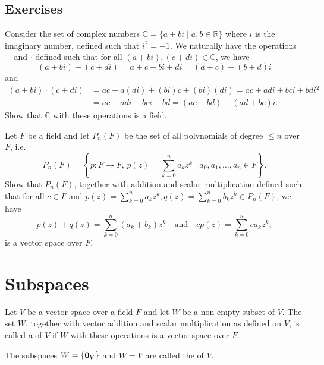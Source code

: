 \subsection*{Exercises}

\begin{exer}\label{exer:cfield}
Consider the set of complex numbers $ \mathbb{C}=\{a+bi\mid a,b\in\mathbb{R}\} $ where $ i $ is the imaginary number, defined such that $ i^2=-1 $. We naturally have the operations $ + $ and $ \cdot $ defined such that for all $ (a+bi),(c+di)\in\mathbb{C} $, we have
\begin{equation*}
    (a+bi)+(c+di)=a+c+bi+di=(a+c)+(b+d)i
\end{equation*}
and
\begin{align*}
    (a+bi)\cdot(c+di) &= ac+a(di)+(bi)c+(bi)(di)=ac+adi+bci+bdi^2 \\
    &= ac+adi+bci-bd=(ac-bd)+(ad+bc)i.
\end{align*}
Show that $ \mathbb{C} $ with these operations is a field.
\end{exer}

\begin{exer}\label{exer:pnvs}
Let $ F $ be a field and let $ P_n(F) $ be the set of all polynomials of degree $ \leq n $ over $ F $, i.e.
\begin{equation*}
    P_n(F)=\left\{p:F\to F,\,p(z)=\sum_{k=0}^n a_k z^k\mid a_0,a_1,\ldots,a_n\in F\right\}.
\end{equation*}
Show that $ P_n(F) $, together with addition and scalar multiplication defined such that for all $ c\in F $ and $ p(z)=\sum_{k=0}^n a_k z^k,q(z)=\sum_{k=0}^n b_k z^k\in P_n(F) $, we have
\begin{equation*}
    p(z)+q(z)=\sum_{k=0}^n (a_k+b_k)z^k \quad\text{and}\quad cp(z)=\sum_{k=0}^n ca_k z^k,
\end{equation*}
is a vector space over $ F $.
\end{exer}

\section{Subspaces}

\begin{defn}
Let $ V $ be a vector space over a field $ F $ and let $ W $ be a non-empty subset of $ V $. The set $ W $, together with vector addition and scalar multiplication as defined on $ V $, is called a  of $ V $ if $ W $ with these operations is a vector space over $ F $.

The subspaces $ W=\{\boldsymbol{\mathbf{0}}_V\} $ and $ W=V $ are called the  of $ V $.
\end{defn}


